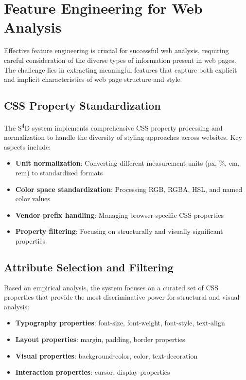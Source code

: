 \section{Feature Engineering for Web Analysis}
\label{sec:feature-engineering}

Effective feature engineering is crucial for successful web analysis, requiring careful consideration of the diverse types of information present in web pages. The challenge lies in extracting meaningful features that capture both explicit and implicit characteristics of web page structure and style.

\subsection{CSS Property Standardization}

The S\textsuperscript{4}D system implements comprehensive CSS property processing and normalization to handle the diversity of styling approaches across websites. Key aspects include:

\begin{itemize}
    \item \textbf{Unit normalization}: Converting different measurement units (px, \%, em, rem) to standardized formats
    \item \textbf{Color space standardization}: Processing RGB, RGBA, HSL, and named color values
    \item \textbf{Vendor prefix handling}: Managing browser-specific CSS properties
    \item \textbf{Property filtering}: Focusing on structurally and visually significant properties
\end{itemize}

\subsection{Attribute Selection and Filtering}

Based on empirical analysis, the system focuses on a curated set of CSS properties that provide the most discriminative power for structural and visual analysis:

\begin{itemize}
    \item \textbf{Typography properties}: font-size, font-weight, font-style, text-align
    \item \textbf{Layout properties}: margin, padding, border properties
    \item \textbf{Visual properties}: background-color, color, text-decoration
    \item \textbf{Interaction properties}: cursor, display properties
\end{itemize}

